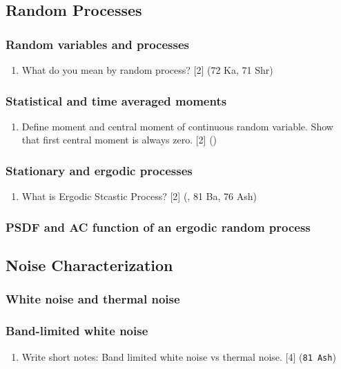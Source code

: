 \documentclass[12pt]{article}
\begin{document}
  \subsection{Random Processes}
    \subsubsection{Random variables and processes}
    	\begin{enumerate}
    		\item What do you mean by random process? \hfill [2] (72 Ka, 71 Shr)
    	\end{enumerate}
    
    \subsubsection{Statistical and time averaged moments}
    	\begin{enumerate}
    		\item Define moment and central moment of continuous random variable. Show that first central moment is always zero. \hfill [2] ()
    	\end{enumerate}
    
    \subsubsection{Stationary and ergodic processes}
    	\begin{enumerate}
    		\item What is Ergodic Stcastic Process? \hfill [2] (, 81 Ba, 76 Ash)
    	\end{enumerate}
    
    \subsubsection{PSDF and AC function of an ergodic random process}
  \subsection{Noise Characterization}
    \subsubsection{White noise and thermal noise}
    \subsubsection{Band-limited white noise}
      \begin{enumerate}
        \item Write short notes: Band limited white noise vs thermal noise. \hfill [4] (\texttt{81 Ash})
      \end{enumerate}
\end{document}
